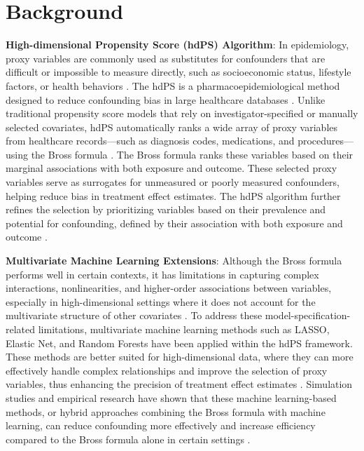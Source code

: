 \documentclass[sn-vancouver,Numbered,lineno,pdflatex]{sn-jnl}
\begin{document}



\maketitle

\section{Background}\label{background}

\textbf{High-dimensional Propensity Score (hdPS) Algorithm}: In
epidemiology, proxy variables are commonly used as substitutes for
confounders that are difficult or impossible to measure directly, such
as socioeconomic status, lifestyle factors, or health behaviors
\citep{vanderweele2019principles}. The hdPS is a pharmacoepidemiological
method designed to reduce confounding bias in large healthcare databases
\citep{schneeweiss2009high}. Unlike traditional propensity score models
that rely on investigator-specified or manually selected covariates,
hdPS automatically ranks a wide array of proxy variables from healthcare
records---such as diagnosis codes, medications, and procedures---using
the Bross formula \citep{wyss2018erratum, bross1966spurious}. The Bross
formula ranks these variables based on their marginal associations with
both exposure and outcome. These selected proxy variables serve as
surrogates for unmeasured or poorly measured confounders, helping reduce
bias in treatment effect estimates. The hdPS algorithm further refines
the selection by prioritizing variables based on their prevalence and
potential for confounding, defined by their association with both
exposure and outcome \citep{schneeweiss2009high}.

\textbf{Multivariate Machine Learning Extensions}: Although the Bross
formula performs well in certain contexts, it has limitations in
capturing complex interactions, nonlinearities, and higher-order
associations between variables, especially in high-dimensional settings
where it does not account for the multivariate structure of other
covariates \citep{karim2024high, karim2018can}. To address these
model-specification-related limitations, multivariate machine learning
methods such as LASSO, Elastic Net, and Random Forests have been applied
within the hdPS framework. These methods are better suited for
high-dimensional data, where they can more effectively handle complex
relationships and improve the selection of proxy variables, thus
enhancing the precision of treatment effect estimates
\citep{karim2018can, schneeweiss2017variable, franklin2015regularized}.
Simulation studies and empirical research have shown that these machine
learning-based methods, or hybrid approaches combining the Bross formula
with machine learning, can reduce confounding more effectively and
increase efficiency compared to the Bross formula alone in certain
settings
\citep{karim2018can, schneeweiss2017variable, franklin2015regularized}.
\end{document}

